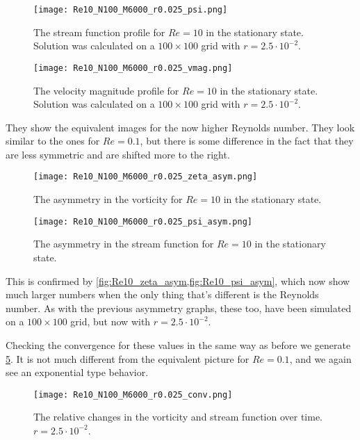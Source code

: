 \documentclass[10pt,a4paper,twocolumn]{article}
\begin{document}
\begin{figure}[!h]
    \centering
    \texttt{[image: Re10\_N100\_M6000\_r0.025\_psi.png]}
    \caption{The stream function profile for $Re=10$ in the stationary state. Solution was calculated on a $100 \times 100$ grid with $r=2.5 \cdot 10^{-2}$.}
    \label{fig:Re10_psi}
\end{figure}

\begin{figure}[!h]
    \centering
    \texttt{[image: Re10\_N100\_M6000\_r0.025\_vmag.png]}
    \caption{The velocity magnitude profile for $Re=10$ in the stationary state. Solution was calculated on a $100 \times 100$ grid with $r=2.5 \cdot 10^{-2}$.}
    \label{fig:Re10_vmag}
\end{figure}

\clearpage
\newpage

They show the equivalent images for the now higher Reynolds number. They look similar to the ones for $Re=0.1$, but there is some difference in the fact that they are less symmetric and are shifted more to the right. 

\begin{figure}[!b]
    \centering
    \texttt{[image: Re10\_N100\_M6000\_r0.025\_zeta\_asym.png]}
    \caption{The asymmetry in the vorticity for $Re=10$ in the stationary state.}
    \label{fig:Re10_zeta_asym}
\end{figure}


\begin{figure}[!b]
    \centering
    \texttt{[image: Re10\_N100\_M6000\_r0.025\_psi\_asym.png]}
    \caption{The asymmetry in the stream function for $Re=10$ in the stationary state.}
    \label{fig:Re10_psi_asym}
\end{figure}

This is confirmed by \cref{fig:Re10_zeta_asym,fig:Re10_psi_asym}, which now show much larger numbers when the only thing that's different is the Reynolds number. As with the previous asymmetry graphs, these too, have been simulated on a $100 \times 100$ grid, but now with $r = 2.5 \cdot 10^{-2}$.

Checking the convergence for these values in the same way as before we generate \cref{fig:Re10_conv}. It is not much different from the equivalent picture for $Re=0.1$, and we again see an exponential type behavior.

\begin{figure}[!h]
    \centering
    \texttt{[image: Re10\_N100\_M6000\_r0.025\_conv.png]}
    \caption{The relative changes in the vorticity and stream function over time. $r=2.5 \cdot 10^{-2}$.}
    \label{fig:Re10_conv}
\end{figure}
\end{document}

